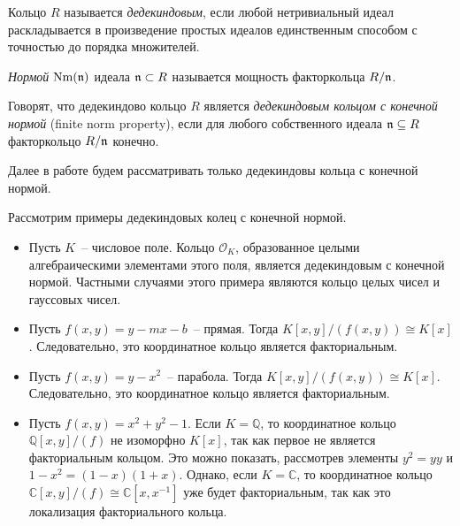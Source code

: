 \documentclass[_00_dissertation.tex]{subfiles}
\begin{document}
\begin{definition}
    Кольцо $R$ называется \emph{дедекиндовым}, если любой нетривиальный идеал раскладывается в произведение простых идеалов единственным способом с точностью до порядка множителей.
\end{definition}

\begin{definition}
    \emph{Нормой} $\textrm{Nm}(\mathfrak{n})$ идеала $\mathfrak{n} \subset R$ называется мощность факторкольца $R/\mathfrak{n}$.

    Говорят, что дедекиндово кольцо $R$ является \emph{дедекиндовым кольцом с конечной нормой} (finite norm property), если для любого собственного идеала $\mathfrak{n} \subseteq R$ факторкольцо $R/\mathfrak{n}$ конечно.
\end{definition}

Далее в работе будем рассматривать только дедекиндовы кольца с конечной нормой.

\begin{example}
    Рассмотрим примеры дедекиндовых колец с конечной нормой.
    \begin{itemize}
        \item Пусть $K$~-- числовое поле.
        Кольцо $\mathcal{O}_K$, образованное целыми алгебраическими элементами этого поля, является дедекиндовым с конечной нормой.
        Частными случаями этого примера являются кольцо целых чисел и гауссовых чисел.
        
        \item Пусть $f(x, y) = y - mx - b$~-- прямая.
        Тогда $K[x, y]/(f(x, y)) \cong K[x]$.
        Следовательно, это координатное кольцо является факториальным.
        
        \item Пусть $f(x, y) = y - x^2$~-- парабола.
        Тогда $K[x, y]/(f(x, y)) \cong K[x]$.
        Следовательно, это координатное кольцо является факториальным.
    
        \item Пусть $f(x, y) = x^2 + y^2 - 1$.
        Если $K = \mathbb{Q}$, то координатное кольцо $\mathbb{Q}[x, y]/(f)$ не изоморфно $K[x]$, так как первое не является факториальным кольцом.
        Это можно показать, рассмотрев элементы $y^2 = yy$ и $1-x^2 = (1-x)(1+x)$.
        Однако, если $K = \mathbb{C}$, то координатное кольцо $\mathbb{C}[x, y]/(f) \cong \mathbb{C}[x, x^{-1}]$ уже будет факториальным, так как это локализация факториального кольца.
    \end{itemize}
\end{example}
\end{document}
